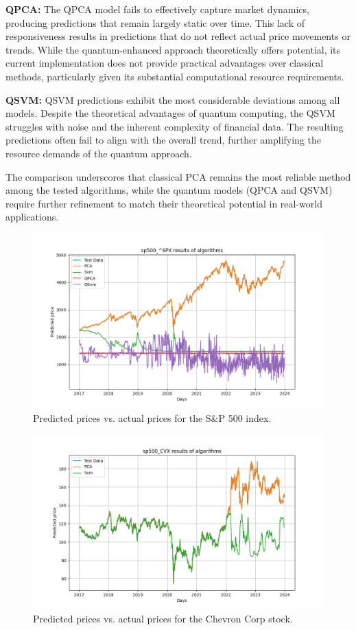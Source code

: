 \documentclass[journal]{IEEEtran}
\begin{document}
\textbf{QPCA:} The QPCA model fails to effectively capture market dynamics, producing predictions that remain largely static over time. This lack of responsiveness results in predictions that do not reflect actual price movements or trends. While the quantum-enhanced approach theoretically offers potential, its current implementation does not provide practical advantages over classical methods, particularly given its substantial computational resource requirements.

\textbf{QSVM:} QSVM predictions exhibit the most considerable deviations among all models. Despite the theoretical advantages of quantum computing, the QSVM struggles with noise and the inherent complexity of financial data. The resulting predictions often fail to align with the overall trend, further amplifying the resource demands of the quantum approach.

The comparison underscores that classical PCA remains the most reliable method among the tested algorithms, while the quantum models (QPCA and QSVM) require further refinement to match their theoretical potential in real-world applications.

\begin{figure}[ht!]
    \centering
    \includegraphics[width=\linewidth]{predicted_vs_actual_price.png}
    \caption{Predicted prices vs. actual prices for the S\&P 500 index.}
    \label{fig:price_comparison}
\end{figure}

\begin{figure}[ht!]
    \centering
    \includegraphics[width=\linewidth]{cvx_svm.png}
    \caption{Predicted prices vs. actual prices for the Chevron Corp stock.}
    \label{fig:cvx_svm}
\end{figure}
\end{document}
